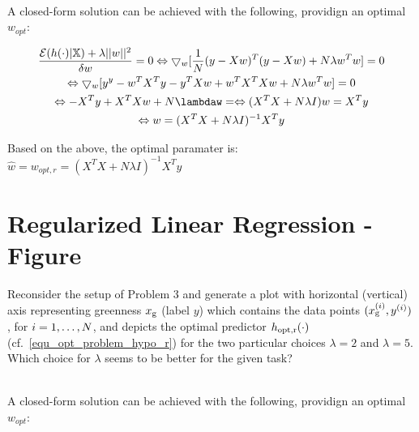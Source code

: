 \documentclass[article,11pt]{article}
\begin{document}
\vspace{3mm}
\\ A closed-form solution can be achieved with the following, providign an optimal $w_{opt}$:

$$
\begin{gathered}
\frac{\mathcal {E}(h(\cdot)|\mathbb{X}) + \lambda ||w||^2}{\delta w}= 0 \Leftrightarrow \bigtriangledown_w [\frac{1}{N}(y - Xw)^T (y - Xw) + N\lambda w^T w] = 0 \\
\Leftrightarrow \bigtriangledown_w [y^y - w^TX^Ty - y^T Xw + w^T X^T Xw + N \lambda w^T w] = 0 \\
\Leftrightarrow -X^T y + X^TXw+N \lambdaw = \Leftrightarrow (X^T X + N \lambda I) w = X^T y \\
\Leftrightarrow w = (X^T X + N \lambda I)^{-1} X^T y

\end{gathered}
$$

Based on the above, the optimal paramater is: $ \hat{w} = w_{opt,r} = (X^T X + N \lambda I)^{-1} X^T y  $


\newpage
\section{Regularized Linear Regression - Figure}
Reconsider the setup of Problem 3 and generate a plot with horizontal (vertical) axis representing greenness $x_{\rm g}$ (label $y$) 
which contains the data points $(x_{\rm g}^{(i)},y^{(i)})$, for $i=1,\ldots,N$, and 
depicts the optimal predictor $h_{\rm opt,r}(\cdot)$ (cf.\ \eqref{equ_opt_problem_hypo_r}) for the two particular choices $\lambda=2$ and $\lambda=5$. 
Which choice for $\lambda$ seems to be better for the given task? 

\vspace{3mm}
\\ A closed-form solution can be achieved with the following, providign an optimal $w_{opt}$:

\newpage
\end{document}
